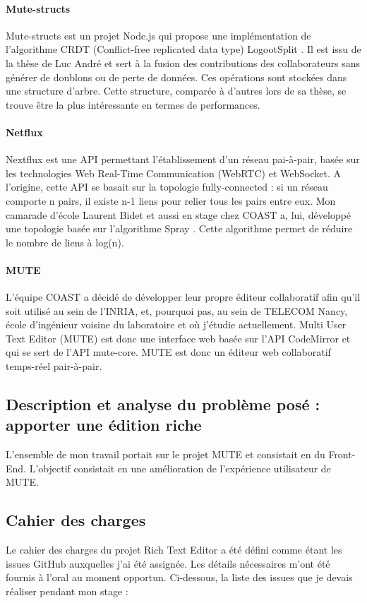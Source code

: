 \documentclass[12pt]{article}
\begin{document}
\paragraph{Mute-structs}
Mute-structs \cite{mute-structs} est un projet Node.js qui propose une implémentation de l'algorithme CRDT (Conflict-free replicated data type) LogootSplit \cite{logoot}. Il est issu de la thèse de Luc André et sert à la fusion des contributions des collaborateurs sans générer de doublons ou de perte de données. Ces opérations sont stockées dans une structure d'arbre. Cette structure, comparée à d'autres lors de sa thèse, se trouve être la plus intéressante en termes de performances.

\paragraph{Netflux}
Nextflux \cite{netflux} est une API permettant l'établissement d'un réseau pai-à-pair, basée sur les technologies Web Real-Time Communication (WebRTC) et WebSocket. A l'origine, cette API se basait sur la topologie fully-connected \cite{fully} : si un réseau comporte n pairs, il existe n-1 liens pour relier tous les pairs entre eux. Mon camarade d'école Laurent Bidet et aussi en stage chez COAST a, lui, développé une topologie basée sur l'algorithme Spray \cite{spray}. Cette algorithme permet de réduire le nombre de liens à log(n).

\paragraph{MUTE}
L'équipe COAST a décidé de développer leur propre éditeur collaboratif afin qu'il soit utilisé au sein de l'INRIA, et, pourquoi pas, au sein de TELECOM Nancy, école d'ingénieur voisine du laboratoire et où j'étudie actuellement. Multi User Text Editor (MUTE) est donc une interface web basée sur l'API CodeMirror et qui se sert de l'API mute-core. MUTE est donc un éditeur web collaboratif temps-réel pair-à-pair.

\subsection{Description et analyse du problème posé : apporter une édition riche}
L'ensemble de mon travail portait sur le projet MUTE et consistait en du Front-End. L'objectif consistait en une amélioration de l'expérience utilisateur de MUTE.


\subsection{Cahier des charges}
Le cahier des charges du projet Rich Text Editor a été défini comme étant les issues GitHub auxquelles j'ai été assignée. Les détails nécessaires m'ont été fournis à l'oral au moment opportun. Ci-dessous, la liste des issues que je devais réaliser pendant mon stage :\\
\end{document}
